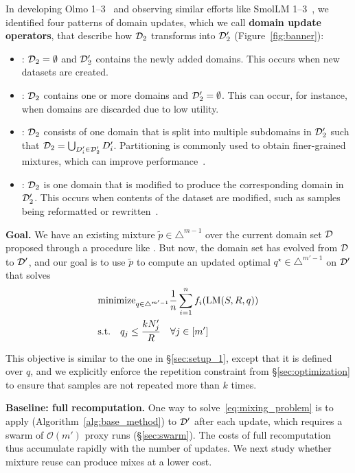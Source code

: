 In developing Olmo 1--3~\citep{olmo2025olmo3} and observing similar efforts like SmolLM 1--3~\citep{bakouch2025smollm3}, we identified four patterns of domain updates, which we call \textbf{domain update operators}, that describe how $\mathcal{D}_2$
transforms into $\mathcal{D}_2'$ (Figure~\ref{fig:banner}):
\begin{itemize}
    \item \Add: $\mathcal{D}_2 = \emptyset$ and $\mathcal{D}_2'$ contains the newly added domains. This occurs when new datasets are created.
    \item \Remove: $\mathcal{D}_2$ contains one or more domains and $\mathcal{D}_2' = \emptyset$. This can occur, for instance, when domains are discarded due to low utility.
    \item \Partition: $\mathcal{D}_2$ consists of one domain that is split into multiple subdomains in $\mathcal{D}_2'$ such that $\mathcal{D}_2 = \bigcup_{D_i' \in \mathcal{D}_2'} D_i'$. Partitioning is commonly used to obtain finer-grained mixtures, which can improve performance~\citep{wettig2025organizewebconstructingdomains, diao2025climbclusteringbasediterativedata,ge2025rbdomainregroupingdata, peng2025topicsourcekeyeffective}.
    \item \Revise: $\mathcal{D}_2$ is one domain that is modified to produce the corresponding domain in $\mathcal{D}_2'$. This occurs when contents of the dataset are modified, such as samples being reformatted or rewritten~\citep{kimiteam2025kimik2openagentic, maini2024rephrasingwebrecipecompute}.
\end{itemize}

\textbf{Goal.} We have an existing mixture $\tilde{p} \in \triangle^{m-1}$ over the current domain set $\mathcal{D}$ proposed through a procedure like \base. 
But now, the domain set has evolved from $\mathcal{D}$ to $\mathcal{D}'$, and our goal is to use $\tilde{p}$ to compute an updated optimal $q^\star \in \triangle^{m' - 1}$ on $\mathcal{D}'$ that solves
\begin{align}
    &\text{minimize}_{q \in \triangle^{m'-1}}  \frac{1}{n} \sum_{i = 1}^n f_i(\text{LM}(S, R, q))
    \label{eq:mixing_problem} \\
    &\text{s.t.} \quad  q_j \le \frac{k N_j'}{R} \quad \forall j \in [m'] \nonumber
\end{align}

This objective is similar to the one in \S\ref{sec:setup_1}, except that it is defined over $q$, and we explicitly enforce the repetition constraint from \S\ref{sec:optimization} to ensure that samples are not repeated more than $k$ times.

\textbf{Baseline: full recomputation.} One way to solve~\eqref{eq:mixing_problem} is to apply \base (Algorithm~\ref{alg:base_method}) to $\mathcal{D}'$ after each update, which requires a swarm of $\mathcal{O}(m')$ proxy runs (\S\ref{sec:swarm}). The costs of full recomputation thus accumulate rapidly with the number of updates. We next study whether mixture reuse can produce mixes at a lower cost.

